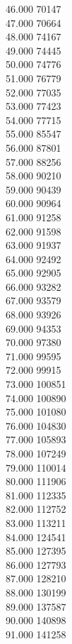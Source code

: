 { 46.000	70147 \\
 47.000	70664 \\
 48.000	74167 \\
 49.000	74445 \\
 50.000	74776 \\
 51.000	76779 \\
 52.000	77035 \\
 53.000	77423 \\
 54.000	77715 \\
 55.000	85547 \\
 56.000	87801 \\
 57.000	88256 \\
 58.000	90210 \\
 59.000	90439 \\
 60.000	90964 \\
 61.000	91258 \\
 62.000	91598 \\
 63.000	91937 \\
 64.000	92492 \\
 65.000	92905 \\
 66.000	93282 \\
 67.000	93579 \\
 68.000	93926 \\
 69.000	94353 \\
 70.000	97380 \\
 71.000	99595 \\
 72.000	99915 \\
 73.000	100851 \\
 74.000	100890 \\
 75.000	101080 \\
 76.000	104830 \\
 77.000	105893 \\
 78.000	107249 \\
 79.000	110014 \\
 80.000	111906 \\
 81.000	112335 \\
 82.000	112752 \\
 83.000	113211 \\
 84.000	124541 \\
 85.000	127395 \\
 86.000	127793 \\
 87.000	128210 \\
 88.000	130199 \\
 89.000	137587 \\
 90.000	140898 \\
 91.000	141258 \\
}
